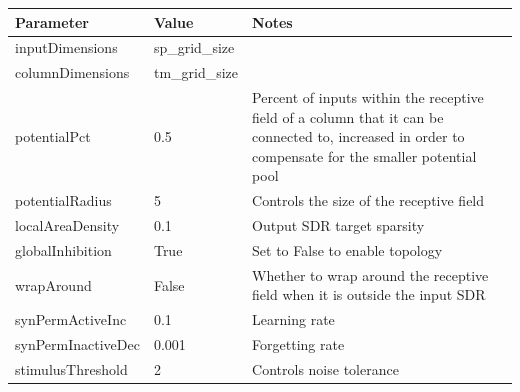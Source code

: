 \begin{table}[H]
    \centering
    \begin{tabularx}{\linewidth}{@{}XlX@{}}
        \toprule
        \textbf{Parameter} & \textbf{Value} & \textbf{Notes}                                                                                                                                        \\
        \midrule
        inputDimensions    & sp\_grid\_size &                                                                                                                                                       \\
        columnDimensions   & tm\_grid\_size &                                                                                                                                                       \\
        potentialPct       & 0.5            & Percent of inputs within the receptive field of a column that it can be connected to, increased in order to compensate for the smaller potential pool \\
        potentialRadius    & 5              & Controls the size of the receptive field                                                                                                              \\
        localAreaDensity   & 0.1            & Output SDR target sparsity                                                                                                                            \\
        globalInhibition   & True           & Set to False to enable topology                                                                                                                       \\
        wrapAround         & False          & Whether to wrap around the receptive field when it is outside the input SDR                                                                           \\
        synPermActiveInc   & 0.1            & Learning rate                                                                                                                                         \\
        synPermInactiveDec & 0.001          & Forgetting rate                                                                                                                                       \\
        stimulusThreshold  & 2              & Controls noise tolerance                                                                                                                              \\

\end{tabularx}
\end{table}

